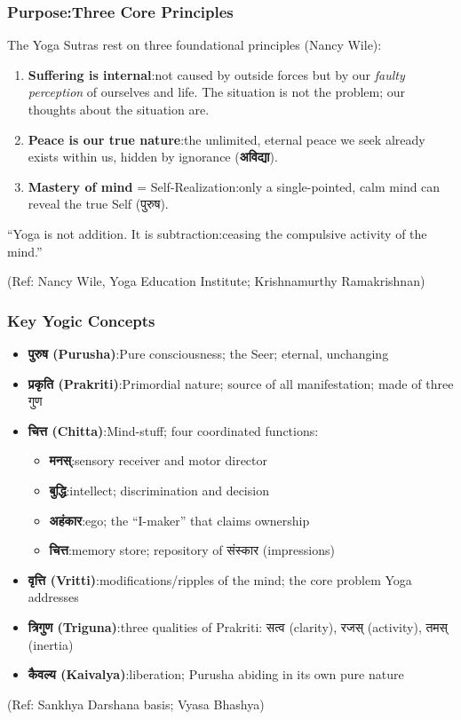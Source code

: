\begin{frame}[fragile]\frametitle{Purpose:Three Core Principles}

The Yoga Sutras rest on three foundational principles (Nancy Wile):

\begin{enumerate}
\item \textbf{Suffering is internal}:not caused by outside forces but by our \emph{faulty perception} of ourselves and life. The situation is not the problem; our thoughts about the situation are.
\item \textbf{Peace is our true nature}:the unlimited, eternal peace we seek already exists within us, hidden by ignorance (\textbf{अविद्या}).
\item \textbf{Mastery of mind} = Self-Realization:only a single-pointed, calm mind can reveal the true Self (पुरुष).
\end{enumerate}

\vspace{3mm}
\begin{center}
{\large ``Yoga is not addition. It is subtraction:ceasing the compulsive activity of the mind.''}
\end{center}

\tiny{(Ref: Nancy Wile, Yoga Education Institute; Krishnamurthy Ramakrishnan)}

\end{frame}

\begin{frame}[fragile]\frametitle{Key Yogic Concepts}

\begin{itemize}
\item \textbf{पुरुष (Purusha)}:Pure consciousness; the Seer; eternal, unchanging
\item \textbf{प्रकृति (Prakriti)}:Primordial nature; source of all manifestation; made of three गुण
\item \textbf{चित्त (Chitta)}:Mind-stuff; four coordinated functions:
    \begin{itemize}
    \item \textbf{मनस्}:sensory receiver and motor director
    \item \textbf{बुद्धि}:intellect; discrimination and decision
    \item \textbf{अहंकार}:ego; the ``I-maker'' that claims ownership
    \item \textbf{चित्त}:memory store; repository of संस्कार (impressions)
    \end{itemize}
\item \textbf{वृत्ति (Vritti)}:modifications/ripples of the mind; the core problem Yoga addresses
\item \textbf{त्रिगुण (Triguna)}:three qualities of Prakriti: सत्व (clarity), रजस् (activity), तमस् (inertia)
\item \textbf{कैवल्य (Kaivalya)}:liberation; Purusha abiding in its own pure nature
\end{itemize}

\tiny{(Ref: Sankhya Darshana basis; Vyasa Bhashya)}

\end{frame}
